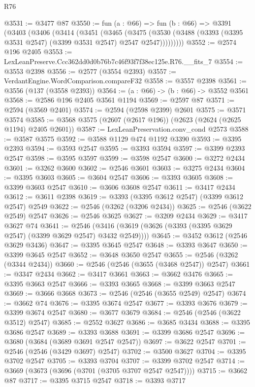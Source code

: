 \begin{lexlean}{R76}
\begin{coremodule}
@3531 := @3477 @87
@3550 := fun (a : @66) =>
  fun (b : @66) =>
  @3391
    (@3403
      (@3406
        (@3414
          (@3451
            (@3465
              (@3475
                (@3530 (@3488 (@3393 (@3395 @3531 @2547) (@3399 @3531 @2547) @2547 @2547)))))))))
@3552 := @2574 @196 @2405
@3553 := LexLeanPreserve.Ccc362dd0d0b76b7c46f93f7f38ec125e.R76.__fits_7
@3554 := @3553 @2398
@3556 := @2577 (@3554 @2393)
@3557 := VerdantEngine.WordComparison.compareF32
@3558 := @3557 @2398
@3561 := @3556 (@137 (@3558 @2393))
@3564 := (a : @66) -> (b : @66) -> @3552 @3561
@3568 := @2586 @196 @2405 @3561 @1194
@3569 := @2597 @87
@3571 := @2594 (@3569 @2401)
@3574 := @2594 (@2598 @2399) @2601
@3575 := @3571 @3574
@3585 := @3568 @3575 (@2607 (@2617 @196)) (@2623 (@2624 (@2625 @1194) @2405 @2601))
@3587 := LexLeanPreservation.conv_cond @2573
@3588 := @3587 @3575
@3592 := @3588 @1129 @474 @1192 @3390
@3593 := @3395 @2393
@3594 := @3593 @2547
@3595 := @3393 @3594
@3597 := @3399 @2393 @2547
@3598 := @3595 @3597
@3599 := @3598 @2547
@3600 := @3272 @2434
@3601 := @3262 @3600
@3602 := @2546 @3601
@3603 := @3275 @2434
@3604 := @3395 @3603
@3605 := @3604 @2547
@3606 := @3393 @3605
@3608 := @3399 @3603 @2547
@3610 := @3606 @3608 @2547
@3611 := @3417 @2434
@3612 := @3611 @2398
@3619 := @3393 (@3395 @3612 @2547) (@3399 @3612 @2547) @2549
@3622 := @2546 (@3262 (@3206 @2434))
@3625 := @2546 (@3622 @2549) @2547
@3626 := @2546 @3625
@3627 := @3209 @2434
@3629 := @3417 @3627 @74
@3641 := @2546 (@3416 (@3619 (@3626 (@3393 (@3395 @3629 @2547) (@3399 @3629 @2547) @3432 @2549))))
@3645 := @3452 @3612 (@2546 @3629 @3436)
@3647 := @3395 @3645 @2547
@3648 := @3393 @3647
@3650 := @3399 @3645 @2547
@3652 := @3648 @3650 @2547
@3655 := @2546 (@3262 (@3344 @2434))
@3660 := @2546 (@2546 (@3655 (@3468 @2547)) @2547)
@3661 := @3347 @2434
@3662 := @3417 @3661
@3663 := @3662 @3476
@3665 := @3395 @3663 @2547
@3666 := @3393 @3665
@3668 := @3399 @3663 @2547
@3669 := @3666 @3668
@3673 := @2546 (@2546 (@3655 @2549) @2547)
@3674 := @3662 @74
@3676 := @3395 @3674 @2547
@3677 := @3393 @3676
@3679 := @3399 @3674 @2547
@3680 := @3677 @3679
@3684 := @2546 (@2546 (@3622 @3512) @2547)
@3685 := @2552 @3627
@3686 := @3685 @3434
@3688 := @3395 @3686 @2547
@3689 := @3393 @3688
@3691 := @3399 @3686 @2547
@3696 := @3680 (@3684 (@3689 @3691 @2547 @2547))
@3697 := @3622 @2547
@3701 := @2546 (@2546 (@3429 @3697) @2547)
@3702 := @3500 @3627
@3704 := @3395 @3702 @2547
@3705 := @3393 @3704
@3707 := @3399 @3702 @2547
@3714 := @3669 (@3673 (@3696 (@3701 (@3705 @3707 @2547 @2547))))
@3715 := @3662 @87
@3717 := @3395 @3715 @2547
@3718 := @3393 @3717

\end{coremodule}
\end{lexlean}
